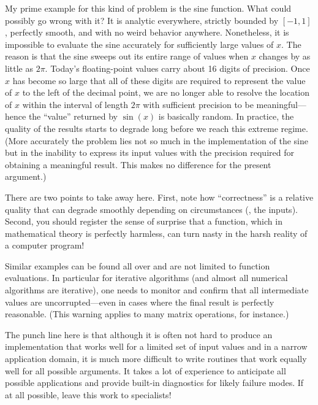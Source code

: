 My prime example for this kind of problem is the sine function. What
could possibly go wrong with it? It is analytic everywhere, strictly
bounded by $[-1,1]$, perfectly smooth, and with no weird behavior
anywhere.  Nonetheless, it is impossible to evaluate the sine
accurately for sufficiently large values of $x$. The reason is that
the sine sweeps out its entire range of values when $x$ changes by as
little as $2 \pi$. Today's floating-point values carry about 16 digits
of precision. Once $x$ has become so large that all of these digits
are required to represent the value of $x$ to the left of the decimal
point, we are no longer able to resolve the location of $x$ within the
interval of length $2 \pi$ with sufficient precision to be
meaningful---hence the ``value'' returned by $\sin(x)$ is basically
random. In practice, the quality of the results starts to degrade long
before we reach this extreme regime. (More accurately the problem lies
not so much in the implementation of the sine but in the inability to
express its input values with the precision required for obtaining a
meaningful result. This makes no difference for the present argument.)

There are two points to take away here.  First, note how
``correctness'' is a relative quality that can degrade smoothly
depending on circumstances (\ie, the inputs).  Second, you should
register the sense of surprise that a function, which in mathematical
theory is perfectly harmless, can turn nasty in the harsh reality of a
computer program!

Similar examples can be found all over and are not limited to function
evaluations.  In particular for iterative algorithms (and almost all
numerical algorithms are iterative), one needs to monitor and confirm
that all intermediate values are uncorrupted---even in cases where the
final result is perfectly reasonable. (This warning applies to many
matrix operations, for instance.)

The punch line here is that although it is often not hard to produce
an implementation that works well for a limited set of input values
and in a narrow application domain, it is much more difficult to write
routines that work equally well for all possible arguments. It takes a
lot of experience to anticipate all possible applications and provide
built-in diagnostics for likely failure modes. If at all possible,
leave this work to specialists!


\vspace*{-6pt}
